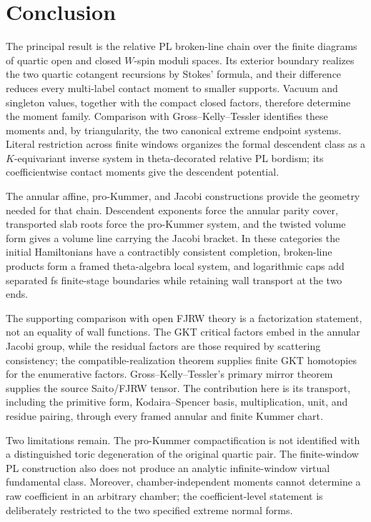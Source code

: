 \section{Conclusion}\label{sec:conclusion}

The principal result is the relative PL broken-line chain over the finite
diagrams of quartic open and closed $W$-spin moduli spaces.  Its exterior
boundary realizes the two quartic cotangent recursions by Stokes' formula, and
their difference reduces every multi-label contact moment to smaller
supports.  Vacuum and singleton values, together with the compact closed
factors, therefore determine the moment family.  Comparison with
Gross--Kelly--Tessler identifies these moments and, by triangularity, the two
canonical extreme endpoint systems.  Literal restriction across finite
windows organizes the formal descendent class as a $K$-equivariant inverse
system in theta-decorated relative PL bordism; its coefficientwise contact
moments give the descendent potential.

The annular affine, pro-Kummer, and Jacobi constructions provide the geometry
needed for that chain.  Descendent exponents force the annular parity cover,
transported slab roots force the pro-Kummer system, and the twisted volume
form gives a volume line carrying the Jacobi bracket.  In these categories the
initial Hamiltonians have a contractibly consistent completion, broken-line
products form a framed theta-algebra local system, and logarithmic caps add
separated fs finite-stage boundaries while retaining wall transport at the
two ends.

The supporting comparison with open FJRW theory is a factorization statement,
not an equality of wall functions.  The GKT critical factors embed in the
annular Jacobi group, while the residual factors are those required by
scattering consistency; the compatible-realization theorem supplies finite
GKT homotopies for the enumerative factors.  Gross--Kelly--Tessler's primary
mirror theorem supplies the source Saito/FJRW tensor.  The contribution here
is its transport, including the primitive form, Kodaira--Spencer basis,
multiplication, unit, and residue pairing, through every framed annular and
finite Kummer chart.

Two limitations remain.  The pro-Kummer compactification is not identified
with a distinguished toric degeneration of the original quartic pair.  The
finite-window PL construction also does not produce an analytic
infinite-window virtual fundamental class.  Moreover, chamber-independent
moments cannot determine a raw coefficient in an arbitrary chamber; the
coefficient-level statement is deliberately restricted to the two specified
extreme normal forms.
